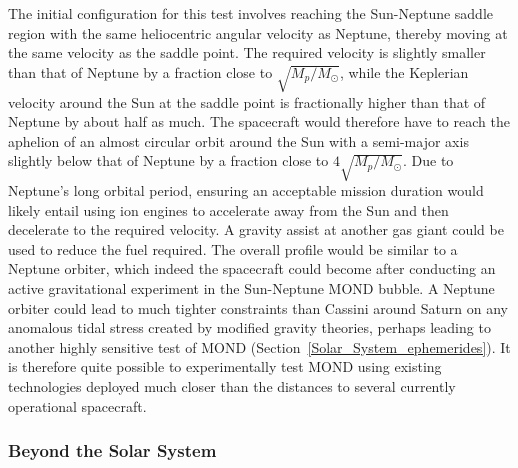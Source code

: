 \documentclass[fleqn,usenatbib,useAMS,onecolumn]{mnras} %
\begin{document}
The initial configuration for this test involves reaching the Sun-Neptune saddle region with the same heliocentric angular velocity as Neptune, thereby moving at the same velocity as the saddle point. The required velocity is slightly smaller than that of Neptune by a fraction close to $\sqrt{M_p/M_\odot}$, while the Keplerian velocity around the Sun at the saddle point is fractionally higher than that of Neptune by about half as much. The spacecraft would therefore have to reach the aphelion of an almost circular orbit around the Sun with a semi-major axis slightly below that of Neptune by a fraction close to $4\sqrt{M_p/M_\odot}$. Due to Neptune's long orbital period, ensuring an acceptable mission duration would likely entail using ion engines to accelerate away from the Sun and then decelerate to the required velocity. A gravity assist at another gas giant could be used to reduce the fuel required. The overall profile would be similar to a Neptune orbiter, which indeed the spacecraft could become after conducting an active gravitational experiment in the Sun-Neptune MOND bubble. A Neptune orbiter could lead to much tighter constraints than Cassini around Saturn on any anomalous tidal stress created by modified gravity theories, perhaps leading to another highly sensitive test of MOND (Section~\ref{Solar_System_ephemerides}). It is therefore quite possible to experimentally test MOND using existing technologies deployed much closer than the distances to several currently operational spacecraft.


\subsubsection{Beyond the Solar System}
\label{Spacecraft_tests_beyond_Solar_System}
\end{document}
